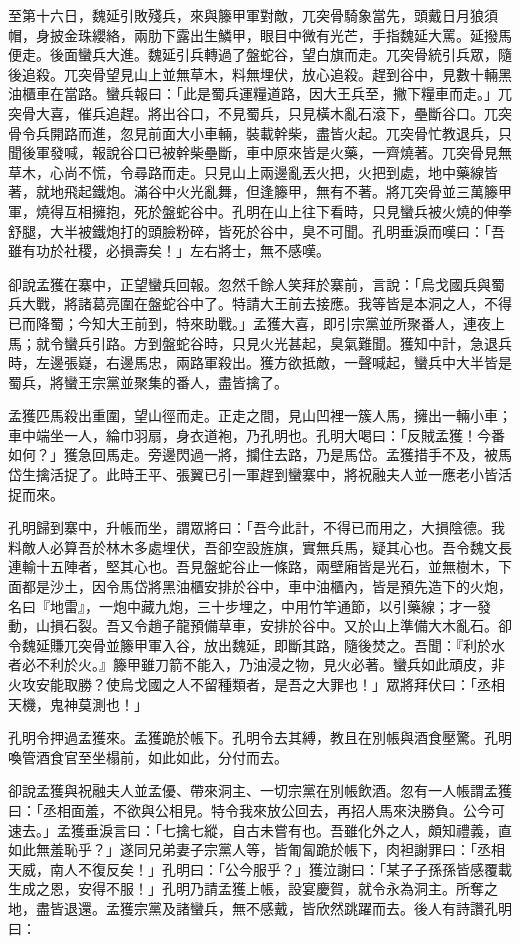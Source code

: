 至第十六日，魏延引敗殘兵，來與籐甲軍對敵，兀突骨騎象當先，頭戴日月狼須帽，身披金珠纓絡，兩肋下露出生鱗甲，眼目中微有光芒，手指魏延大罵。延撥馬便走。後面蠻兵大進。魏延引兵轉過了盤蛇谷，望白旗而走。兀突骨統引兵眾，隨後追殺。兀突骨望見山上並無草木，料無埋伏，放心追殺。趕到谷中，見數十輛黑油櫃車在當路。蠻兵報曰：「此是蜀兵運糧道路，因大王兵至，撇下糧車而走。」兀突骨大喜，催兵追趕。將出谷口，不見蜀兵，只見橫木亂石滾下，壘斷谷口。兀突骨令兵開路而進，忽見前面大小車輛，裝載幹柴，盡皆火起。兀突骨忙教退兵，只聞後軍發喊，報說谷口已被幹柴壘斷，車中原來皆是火藥，一齊燒著。兀突骨見無草木，心尚不慌，令尋路而走。只見山上兩邊亂丟火把，火把到處，地中藥線皆著，就地飛起鐵炮。滿谷中火光亂舞，但逢籐甲，無有不著。將兀突骨並三萬籐甲軍，燒得互相擁抱，死於盤蛇谷中。孔明在山上往下看時，只見蠻兵被火燒的伸拳舒腿，大半被鐵炮打的頭臉粉碎，皆死於谷中，臭不可聞。孔明垂淚而嘆曰：「吾雖有功於社稷，必損壽矣！」左右將士，無不感嘆。

卻說孟獲在寨中，正望蠻兵回報。忽然千餘人笑拜於寨前，言說：「烏戈國兵與蜀兵大戰，將諸葛亮圍在盤蛇谷中了。特請大王前去接應。我等皆是本洞之人，不得已而降蜀；今知大王前到，特來助戰。」孟獲大喜，即引宗黨並所聚番人，連夜上馬；就令蠻兵引路。方到盤蛇谷時，只見火光甚起，臭氣難聞。獲知中計，急退兵時，左邊張嶷，右邊馬忠，兩路軍殺出。獲方欲抵敵，一聲喊起，蠻兵中大半皆是蜀兵，將蠻王宗黨並聚集的番人，盡皆擒了。

孟獲匹馬殺出重圍，望山徑而走。正走之間，見山凹裡一簇人馬，擁出一輛小車；車中端坐一人，綸巾羽扇，身衣道袍，乃孔明也。孔明大喝曰：「反賊孟獲！今番如何？」獲急回馬走。旁邊閃過一將，攔住去路，乃是馬岱。孟獲措手不及，被馬岱生擒活捉了。此時王平、張翼已引一軍趕到蠻寨中，將祝融夫人並一應老小皆活捉而來。

孔明歸到寨中，升帳而坐，謂眾將曰：「吾今此計，不得已而用之，大損陰德。我料敵人必算吾於林木多處埋伏，吾卻空設旌旗，實無兵馬，疑其心也。吾令魏文長連輸十五陣者，堅其心也。吾見盤蛇谷止一條路，兩壁廂皆是光石，並無樹木，下面都是沙土，因令馬岱將黑油櫃安排於谷中，車中油櫃內，皆是預先造下的火炮，名曰『地雷』，一炮中藏九炮，三十步埋之，中用竹竿通節，以引藥線；才一發動，山損石裂。吾又令趙子龍預備草車，安排於谷中。又於山上準備大木亂石。卻令魏延賺兀突骨並籐甲軍入谷，放出魏延，即斷其路，隨後焚之。吾聞：『利於水者必不利於火。』籐甲雖刀箭不能入，乃油浸之物，見火必著。蠻兵如此頑皮，非火攻安能取勝？使烏戈國之人不留種類者，是吾之大罪也！」眾將拜伏曰：「丞相天機，鬼神莫測也！」

孔明令押過孟獲來。孟獲跪於帳下。孔明令去其縛，教且在別帳與酒食壓驚。孔明喚管酒食官至坐榻前，如此如此，分付而去。

卻說孟獲與祝融夫人並孟優、帶來洞主、一切宗黨在別帳飲酒。忽有一人帳謂孟獲曰：「丞相面羞，不欲與公相見。特令我來放公回去，再招人馬來決勝負。公今可速去。」孟獲垂淚言曰：「七擒七縱，自古未嘗有也。吾雖化外之人，頗知禮義，直如此無羞恥乎？」遂同兄弟妻子宗黨人等，皆匍匐跪於帳下，肉袒謝罪曰：「丞相天威，南人不復反矣！」孔明曰：「公今服乎？」獲泣謝曰：「某子子孫孫皆感覆載生成之恩，安得不服！」孔明乃請孟獲上帳，設宴慶賀，就令永為洞主。所奪之地，盡皆退還。孟獲宗黨及諸蠻兵，無不感戴，皆欣然跳躍而去。後人有詩讚孔明曰：

